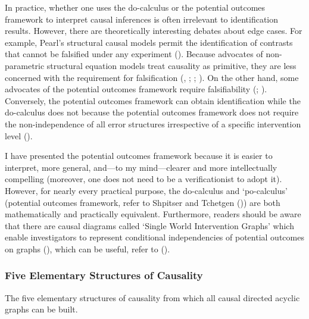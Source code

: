 \documentclass[
  single column]{article}
\begin{document}
In practice, whether one uses the do-calculus or the potential outcomes
framework to interpret causal inferences is often irrelevant to
identification results. However, there are theoretically interesting
debates about edge cases. For example, Pearl's structural causal models
permit the identification of contrasts that cannot be falsified under
any experiment (). Because advocates of non-parametric structural equation models
treat causality as primitive, they are less concerned with the
requirement for falsification (, ;
;
). On the
other hand, some advocates of the potential outcomes framework require
falsifiability (; ). Conversely, the potential outcomes framework can obtain
identification while the do-calculus does not because the potential
outcomes framework does not require the non-independence of all error
structures irrespective of a specific intervention level
().

I have presented the potential outcomes framework because it is easier
to interpret, more general, and---to my mind---clearer and more
intellectually compelling (moreover, one does not need to be a
verificationist to adopt it). However, for nearly every practical
purpose, the do-calculus and `po-calculus' (potential outcomes
framework, refer to Shpitser and Tchetgen
()) are both mathematically and
practically equivalent. Furthermore, readers should be aware that there
are causal diagrams called `Single World Intervention Graphs' which
enable investigators to represent conditional independencies of
potential outcomes on graphs
(),
which can be useful, refer to ().

\subsubsection{Five Elementary Structures of
Causality}\label{five-elementary-structures-of-causality}

\begin{table}

\caption{\label{tbl-fiveelementary}The five elementary structures of
causality from which all causal directed acyclic graphs can be built.}

\centering{

\terminologydirectedgraph

}

\end{table}%
\end{document}
